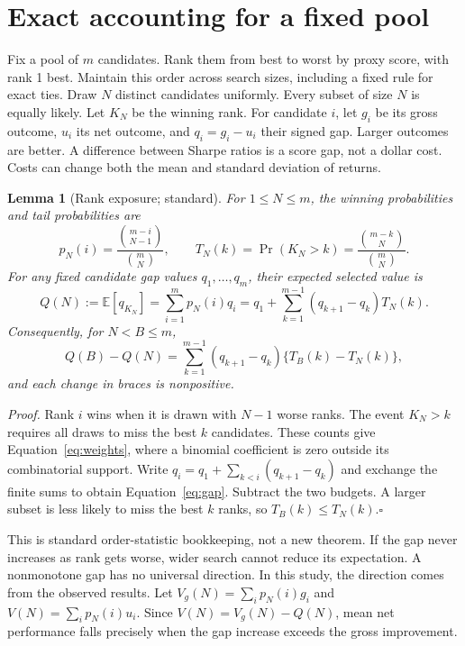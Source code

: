 \documentclass{article}
\newcommand{\E}{\mathbb{E}}
\newtheorem{lemma}{Lemma}
\begin{document}
\section{Exact accounting for a fixed pool}
Fix a pool of $m$ candidates. Rank them from best to worst by proxy score, with rank 1 best. Maintain this order across search sizes, including a fixed rule for exact ties. Draw $N$ distinct candidates uniformly. Every subset of size $N$ is equally likely. Let $K_N$ be the winning rank. For candidate $i$, let $g_i$ be its gross outcome, $u_i$ its net outcome, and $q_i=g_i-u_i$ their signed gap. Larger outcomes are better. A difference between Sharpe ratios is a score gap, not a dollar cost. Costs can change both the mean and standard deviation of returns.

\begin{lemma}[Rank exposure; standard]\label{lem:rank}
For $1\leq N\leq m$, the winning probabilities and tail probabilities are
\begin{equation}
 p_N(i)=\frac{\binom{m-i}{N-1}}{\binom mN},\qquad
 T_N(k)=\Pr(K_N>k)=\frac{\binom{m-k}{N}}{\binom mN}.
 \label{eq:weights}
\end{equation}
For any fixed candidate gap values $q_1,\ldots,q_m$, their expected selected value is
\begin{equation}
 Q(N):=\E[q_{K_N}]=\sum_{i=1}^m p_N(i)q_i
 =q_1+\sum_{k=1}^{m-1}(q_{k+1}-q_k)T_N(k).
 \label{eq:gap}
\end{equation}
Consequently, for $N<B\leq m$,
\begin{equation}
 Q(B)-Q(N)=\sum_{k=1}^{m-1}(q_{k+1}-q_k)\{T_B(k)-T_N(k)\},
 \label{eq:change}
\end{equation}
and each change in braces is nonpositive.
\end{lemma}
\noindent\emph{Proof.} Rank $i$ wins when it is drawn with $N-1$ worse ranks. The event $K_N>k$ requires all draws to miss the best $k$ candidates. These counts give Equation~\eqref{eq:weights}, where a binomial coefficient is zero outside its combinatorial support. Write $q_i=q_1+\sum_{k<i}(q_{k+1}-q_k)$ and exchange the finite sums to obtain Equation~\eqref{eq:gap}. Subtract the two budgets. A larger subset is less likely to miss the best $k$ ranks, so $T_B(k)\leq T_N(k)$.\hfill$\square$

This is standard order-statistic bookkeeping, not a new theorem. If the gap never increases as rank gets worse, wider search cannot reduce its expectation. A nonmonotone gap has no universal direction. In this study, the direction comes from the observed results. Let $V_g(N)=\sum_i p_N(i)g_i$ and $V(N)=\sum_i p_N(i)u_i$. Since $V(N)=V_g(N)-Q(N)$, mean net performance falls precisely when the gap increase exceeds the gross improvement.
\end{document}
